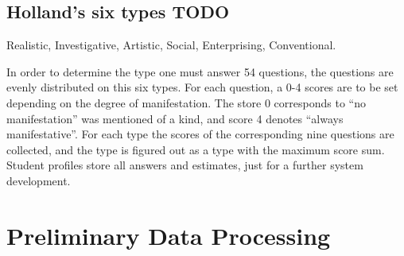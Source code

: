 \documentclass[conference,a4]{IEEEtran}
\begin{document}




\subsection{Holland's six types TODO}

Realistic, Investigative, Artistic, Social, Enterprising, Conventional. %

In order to determine the type one must answer 54 questions, the questions are evenly distributed on this six types.  For each question, a 0-4 scores are to be set depending on the degree of manifestation. The store 0 corresponds to ``no manifestation'' was mentioned of a kind, and score 4 denotes ``always manifestative''.  For each type the scores of the corresponding nine questions are collected, and the type is figured out as a type with the maximum score sum.  Student profiles store all answers and estimates, just for a further system development.

\section{Preliminary Data Processing}
\label{sec:relim-proc}


\end{document}

